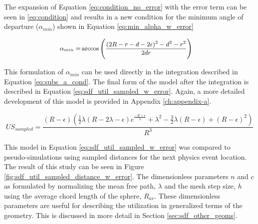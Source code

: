 The expansion of Equation \eqref{eq:condition_no_error} with the error term can be seen
in \eqref{eq:condition} and results in a new condition for the minimum angle of
departure ($\alpha_{min}$) shown in Equation \eqref{eq:min_alpha_w_error}

\begin{equation}
\small
\begin{split}
\alpha_{min} =& \arccos\Bigg ( \frac{(2R-r-d-2\epsilon)^2-d^2-r^2}{2 d r} \Bigg )
\end{split}
\label{eq:min_alpha_w_error}
\end{equation}

This formulation of $\alpha_{min}$ can be used directly in the integration described
in Equation \eqref{eq:subs_a_cond}. The final form of the model after the
integration is described in Equation \eqref{eq:sdf_util_sampled_w_error}. Again, a
more detailed development of this model is provided in Appendix \ref{ch:appendix-a}.

\begin{equation}
  US_{sampled} = \frac{(R-\epsilon) (\frac{1}{2} \lambda ( R - 2\lambda - \epsilon ) e^{\frac{-R + \epsilon}{\lambda}} + \lambda^{2} - \frac{3}{2}\lambda(R - \epsilon) + (R-\epsilon)^{2})}{R^3}
  \label{eq:sdf_util_sampled_w_error}
\end{equation}



This model in Equation \eqref{eq:sdf_util_sampled_w_error} was compared to
pseudo-simulations using sampled distances for the next physics event
location. The result of this study can be seen in Figure
\ref{fig:sdf_util_sampled_distance_w_error}. The dimensionless parameters $n$
and $c$ as formulated by normalizing the mean free path, $\lambda$ and the mesh
step size, $h$ using the average chord length of the sphere, $R_{av}$. These
dimensionless parameters are useful for describing the utilization in
generalized terms of the geometry. This is discussed in more detail in
Section \ref{sec:sdf_other_geoms}.


